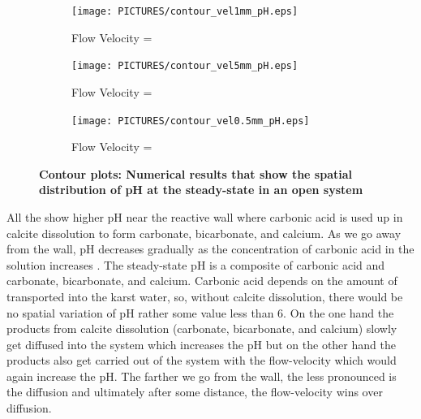 \begin{figure}[!h]
\centering
    \begin{subfigure}{.5\linewidth}
        \centering
        \texttt{[image: PICTURES/contour\_vel1mm\_pH.eps]}
        \caption{\small Flow Velocity = }
        \label{fig:pHSteady-state}       %
    \end{subfigure}%
    \hfill
    \begin{subfigure}{.5\linewidth}
        \centering
        \texttt{[image: PICTURES/contour\_vel5mm\_pH.eps]}
        \caption{\small Flow Velocity = }
        \label{fig:pHSteady-state5mm}       %
    \end{subfigure}%
    \hfill
    \begin{subfigure}{.5\linewidth}
        \centering
        \texttt{[image: PICTURES/contour\_vel0.5mm\_pH.eps]}
        \caption{\small Flow Velocity = }
        \label{fig:pHSteady-state0.5mm}       %
    \end{subfigure}%
    \caption [\DuMuX Contour plots: Numerical results that show the spatial distribution of pH at the steady-state in an open system] {\textbf{\DuMuX Contour plots: Numerical results that show the spatial distribution of pH at the steady-state in an open system}}
     \label{fig:contourpH}
\end{figure}

All the  show higher pH near the reactive wall 
where carbonic acid is used up in calcite dissolution to form carbonate, bicarbonate, and calcium. 
As we go away from the wall, pH decreases gradually as the concentration of carbonic acid in the solution increases . 
The steady-state pH is a composite of carbonic acid and carbonate, bicarbonate, and calcium. Carbonic acid depends on the amount of  
transported into the karst water, so, without calcite dissolution, there would be no spatial variation of pH rather some value less than 6. 
On the one hand the products from calcite dissolution (carbonate, bicarbonate, and calcium) slowly get diffused into the system which 
increases the pH but on the other hand the products also get carried 
out of the system with the flow-velocity which would again increase the pH. The farther we go from the wall, the less pronounced is the diffusion 
and ultimately after some distance, the flow-velocity wins over diffusion. \\

